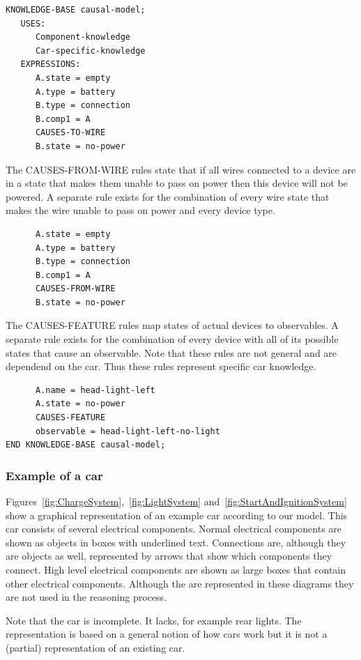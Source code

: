 \begin{verbatim}
KNOWLEDGE-BASE causal-model;
   USES:
      Component-knowledge
      Car-specific-knowledge
   EXPRESSIONS:
      A.state = empty
      A.type = battery
      B.type = connection
      B.comp1 = A
      CAUSES-TO-WIRE
      B.state = no-power
\end{verbatim}

\noindent
The CAUSES-FROM-WIRE rules state that if all wires connected to a device are in a state that makes them unable to pass on power then this device will not be powered. A separate rule exists for the combination of every wire state that makes the wire unable to pass on power and every device type.

\begin{verbatim}
      A.state = empty
      A.type = battery
      B.type = connection
      B.comp1 = A
      CAUSES-FROM-WIRE
      B.state = no-power
\end{verbatim}

\noindent
The CAUSES-FEATURE rules map states of actual devices to observables. A separate rule exists for the combination of every device with all of its possible states that cause an observable. Note that these rules are not general and are dependend on the car. Thus these rules represent specific car knowledge.

\begin{verbatim}
      A.name = head-light-left
      A.state = no-power
      CAUSES-FEATURE
      observable = head-light-left-no-light
END KNOWLEDGE-BASE causal-model;
\end{verbatim}


\subsubsection{Example of a car}
Figures~\ref{fig:ChargeSystem},~\ref{fig:LightSystem} and~\ref{fig:StartAndIgnitionSystem} show a graphical representation of an example car according to our model. This car consists of several electrical components. Normal electrical components are shown as objects in boxes with underlined text. Connections are, although they are objects as well, represented by arrows that show which components they connect. High level electrical components are shown as large boxes that contain other electrical components. Although the are represented in these diagrams they are not used in the reasoning process.

Note that the car is incomplete. It lacks, for example rear lights. The representation is based on a general notion of how cars work but it is not a (partial) representation of an existing car.

